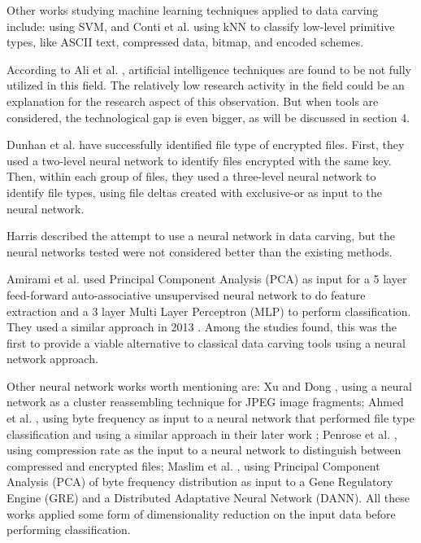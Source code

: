 Other works studying machine learning techniques applied to data carving include: \cite{luigi_file_2011} using SVM,
and Conti et al. \cite{conti_automated_2010} using kNN to classify low-level primitive types, like ASCII text, compressed data, bitmap, and encoded schemes.

According to Ali et al. \cite{ali_review_2018}, artificial intelligence techniques are found to be not fully utilized in this field. The relatively low research activity in the field could be an explanation for the research aspect of this observation. But when tools are considered, the technological gap is even bigger, as will be discussed in section 4.

Dunhan et al. \cite{dunham_classifying_2005} have successfully identified file type of encrypted files. First, they used a two-level neural network to identify files encrypted with the same key. Then, within each group of files, they used a three-level neural network to identify file types, using file deltas created with exclusive-or as input to the neural network. 

Harris \cite{harris_using_2007} described the attempt to use a neural network in data carving, but the neural networks tested were not considered better than the existing methods.

Amirami et al.  \cite{amirani_new_2008} used Principal Component Analysis (PCA) as input for a 5 layer feed-forward auto-associative unsupervised neural network to do feature extraction and a 3 layer Multi Layer Perceptron (MLP) to perform classification. They used a similar approach in 2013 \cite{amirani_feature-based_2013}. 
Among the studies found, this was the first to provide a viable alternative to classical data carving tools using a neural network approach. 

Other neural network works worth mentioning are:
Xu and Dong \cite{xu_reassembling_2009}, using a neural network as a cluster reassembling technique for JPEG image fragments;
Ahmed et al. \cite{ahmed_content-based_2010}, using byte frequency as input to a neural network that performed file type classification and using a similar approach in their later work \cite{ahmed_fast_2011};
Penrose et al. \cite{penrose_approaches_2013}, using compression rate as the input to a neural network to distinguish between compressed and encrypted files;
Maslim et al. \cite{maslim_distributed_2014}, using Principal Component Analysis (PCA) of byte frequency distribution as input to a Gene Regulatory Engine (GRE) and a Distributed Adaptative Neural Network (DANN).
All these works applied some form of dimensionality reduction on the input data before performing classification.

